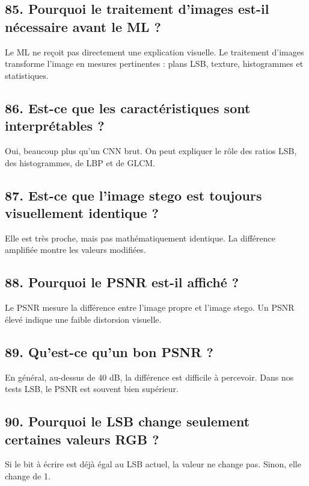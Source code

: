 \documentclass[11pt,a4paper]{article}
\begin{document}
\subsection{85. Pourquoi le traitement d'images est-il nécessaire avant le ML ?}

Le ML ne reçoit pas directement une explication visuelle. Le traitement d'images transforme l'image en mesures pertinentes : plans LSB, texture, histogrammes et statistiques.

\subsection{86. Est-ce que les caractéristiques sont interprétables ?}

Oui, beaucoup plus qu'un CNN brut. On peut expliquer le rôle des ratios LSB, des histogrammes, de LBP et de GLCM.

\subsection{87. Est-ce que l'image stego est toujours visuellement identique ?}

Elle est très proche, mais pas mathématiquement identique. La différence amplifiée montre les valeurs modifiées.

\subsection{88. Pourquoi le PSNR est-il affiché ?}

Le PSNR mesure la différence entre l'image propre et l'image stego. Un PSNR élevé indique une faible distorsion visuelle.

\subsection{89. Qu'est-ce qu'un bon PSNR ?}

En général, au-dessus de 40 dB, la différence est difficile à percevoir. Dans nos tests LSB, le PSNR est souvent bien supérieur.

\subsection{90. Pourquoi le LSB change seulement certaines valeurs RGB ?}

Si le bit à écrire est déjà égal au LSB actuel, la valeur ne change pas. Sinon, elle change de 1.
\end{document}
